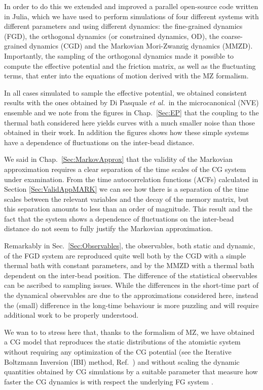 \documentclass[10pt,a4paper]{book}
\theoremstyle{definition}
\begin{document}
\noindent
In order to do this we extended and improved a parallel open-source code written in Julia, which we have used to perform simulations of four different systems with different parameters and using different dynamics: the fine-grained dynamics (FGD), the orthogonal dynamics (or constrained dynamics, OD), the  coarse-grained dynamics (CGD) and the Markovian Mori-Zwanzig dynamics (MMZD). Importantly, the sampling of the orthogonal dynamics made it possible to compute the effective potential and the friction matrix, as well as the fluctuating terms, that enter into the equations of motion derived with the MZ formalism.

In all cases simulated to sample the effective potential, we obtained consistent results with the ones obtained by Di Pasquale \textit{et al.}~in the microcanonical (NVE) ensemble and we note from the figures in Chap.~\ref{Sec:EP} that the coupling to the thermal bath considered here yields curves with a much smaller noise than those obtained in their work. In addition the figures shows how these simple systems have a dependence of fluctuations on the inter-bead distance.

We said in Chap.~\ref{Sec:MarkovApprox} that the validity of the Markovian approximation requires a clear separation of the time scales of the CG system under examination. From the time autocorrelation functions (ACFs) calculated in Section \ref{Sec:ValidAppMARK} we can see how there is a separation of the time scales between the relevant variables and the decay of the memory matrix, but this separation amounts to less than an order of magnitude. This result and the fact that the system shows a dependence of fluctuations on the inter-bead distance do not seem to fully justify the Markovian approximation.

Remarkably in Sec.~\ref{Sec:Observables}, the observables, both static and dynamic, of the FGD system are reproduced quite well both by the CGD with a simple thermal bath with constant parameters, and by the MMZD with a thermal bath dependent on the inter-bead position. The difference of the statistical observables can be ascribed to sampling issues. While the differences in the short-time part of the dynamical observables are due to the approximations considered here, instead  the (small) difference in the long-time behaviour is more puzzling and will require additional work to be properly understood.

We wan to to stress here that, thanks to the formalism of MZ, we have obtained a CG model that reproduces the static distributions of the atomistic system without requiring any optimization of the CG potential (see the Iterative Boltzmann Inversion (IBI) method, Ref.~\cite{Reith2003}) and without scaling the dynamic quantities obtained by CG simulations by a suitable parameter that measure how faster the CG dynamics is with respect the underlying FG system \cite{Fritz2009}.
\end{document}
